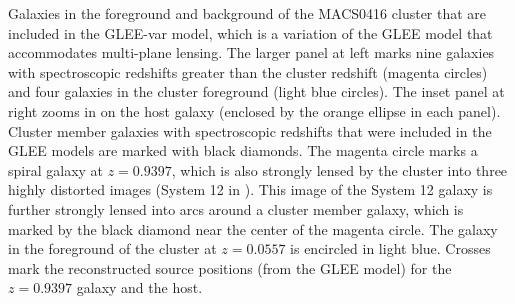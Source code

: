 \label{fig:LineOfSightLenses}
Galaxies in the foreground and background of the MACS0416 cluster that
are included in the GLEE-var model, which is a variation of the GLEE
model that accommodates multi-plane lensing. The larger panel at left
marks nine galaxies with spectroscopic redshifts greater than the
cluster redshift (magenta circles) and four galaxies in the cluster
foreground (light blue circles).  The inset panel at right zooms in on
the \spock host galaxy (enclosed by the orange ellipse in each panel).
Cluster member galaxies with spectroscopic redshifts that were
included in the GLEE models are marked with black diamonds.  The
magenta circle marks a spiral galaxy at $z=0.9397$, which is also
strongly lensed by the  cluster into three highly distorted
images (System 12 in \citet{Caminha:2017}). This image of the System
12 galaxy is further strongly lensed into arcs around a cluster member
galaxy, which is marked by the black diamond near the center of the
magenta circle.  The galaxy in the foreground of the cluster at
$z=0.0557$ is encircled in light blue.  Crosses mark the reconstructed
source positions (from the GLEE model) for the $z=0.9397$ galaxy and
the \spock host.
